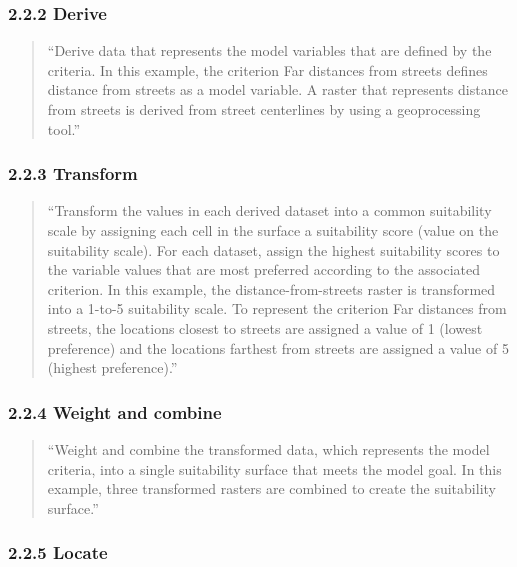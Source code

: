 \documentclass[
]{agujournal2019}
\begin{document}
\subsubsection{2.2.2 Derive}\label{derive}

\begin{quote}
``Derive data that represents the model variables that are defined by
the criteria. In this example, the criterion Far distances from streets
defines distance from streets as a model variable. A raster that
represents distance from streets is derived from street centerlines by
using a geoprocessing tool.''
\end{quote}

\subsubsection{2.2.3 Transform}\label{transform}

\begin{quote}
``Transform the values in each derived dataset into a common suitability
scale by assigning each cell in the surface a suitability score (value
on the suitability scale). For each dataset, assign the highest
suitability scores to the variable values that are most preferred
according to the associated criterion. In this example, the
distance-from-streets raster is transformed into a 1-to-5 suitability
scale. To represent the criterion Far distances from streets, the
locations closest to streets are assigned a value of 1 (lowest
preference) and the locations farthest from streets are assigned a value
of 5 (highest preference).''
\end{quote}

\subsubsection{2.2.4 Weight and combine}\label{weight-and-combine}

\begin{quote}
``Weight and combine the transformed data, which represents the model
criteria, into a single suitability surface that meets the model goal.
In this example, three transformed rasters are combined to create the
suitability surface.''
\end{quote}

\subsubsection{2.2.5 Locate}\label{locate}
\end{document}
